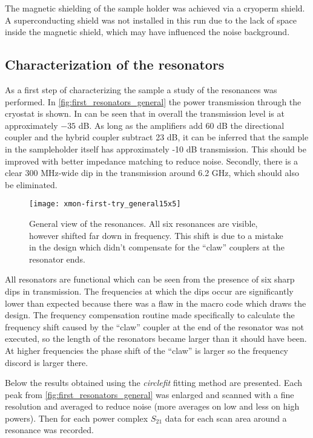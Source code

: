 \documentclass[12pt, twoside]{report}
\numberwithin{equation}{section}
\begin{document}
The magnetic shielding of the sample holder was achieved via a cryoperm shield. A superconducting shield was not installed in this run due to the lack of space inside the magnetic shield, which may have influenced the noise background.


\subsection{Characterization of the resonators}

As a first step of characterizing the sample a study of the resonances was performed. In \autoref{fig:first_resonators_general} the power transmission through the cryostat is shown. In can be seen that in overall the transmission level is at approximately $-35$ dB. As long as the amplifiers add 60 dB the directional coupler and the hybrid coupler subtract 23 dB, it can be inferred that the sample in the sampleholder itself has approximately -10 dB transmission. This should be improved with better impedance matching to reduce noise. Secondly, there is a clear 300 MHz-wide dip in the transmission around 6.2 GHz, which should also be eliminated.

\begin{figure}[h]
\centering
\texttt{[image: xmon-first-try\_general15x5]}
\caption{General view of the resonances. All six resonances are visible, however shifted far down in frequency. This shift is due to a mistake in the design which didn't compensate for the ``claw'' couplers at the resonator ends.}
\label{fig:first_resonators_general}
\end{figure}

All resonators are functional which can be seen from the presence of six sharp dips in transmission. The frequencies at which the dips occur are significantly lower than expected because there was a flaw in the macro code which draws the design. The frequency compensation routine made specifically to calculate the frequency shift\cite{Sank2014} caused by the ``claw'' coupler at the end of the resonator was not executed, so the length of the resonators became larger than it should have been. At higher frequencies the phase shift of the ``claw'' is larger so the frequency discord is larger there.

Below the results obtained using the \textit{circlefit}\cite{probst2015} fitting method are presented. Each peak from \autoref{fig:first_resonators_general} was enlarged and scanned with a fine resolution and averaged to reduce noise (more averages on low and less on high powers). Then for each power complex $S_{21}$ data for each scan area around a resonance was recorded.
\end{document}

